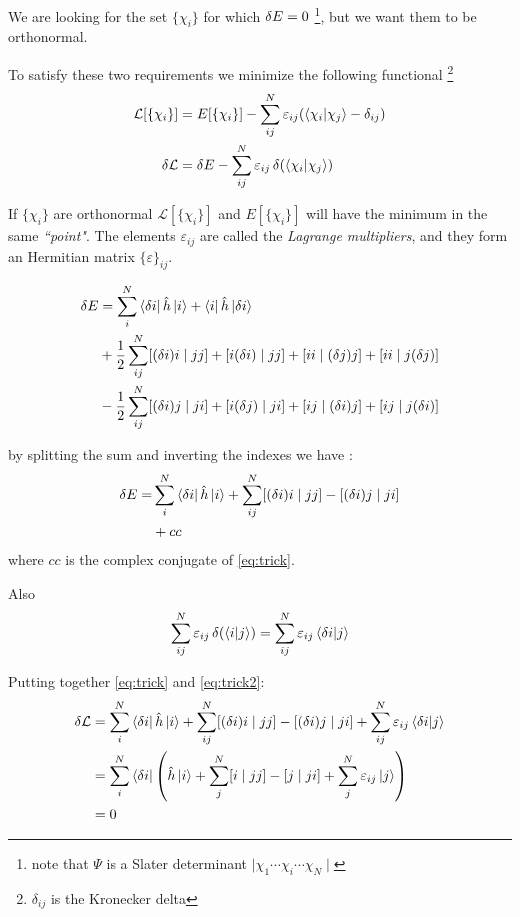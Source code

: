\documentclass[a4paper,12pt]{article}
\begin{document}
We are looking for the set $\{\chi_i\}$ for which $\var{E} = 0$ \footnote{note that $\Psi$ is a Slater determinant $\mid \chi_1 \cdots \chi_i \cdots \chi_N \mid$}, but we want them to be orthonormal.

To satisfy these two requirements we minimize the following functional \footnote{$\delta_{ij}$ is the Kronecker delta} 
\begin{align}
	\mathcal{L}[\{\chi_{i}\}] & = E[\{\chi_i\}] - \sum_{ij}^{N} \varepsilon_{ij} (\bra{\chi_{i}}\ket{\chi_{j}} - \delta_{ij})
\\
	\var{\mathcal{L}} & = \var{E} - \sum_{ij}^{N} \varepsilon_{ij} \var{(\bra{\chi_{i}}\ket{\chi_{j}})}	
\end{align}

If $\{\chi_i\}$ are orthonormal $\mathcal{L}[\{\chi_{i}\}]$ and $E[\{\chi_i\}]$ will have the minimum in the same \textit{``point"}. The elements $\varepsilon_{ij}$ are called the \textit{Lagrange multipliers}, and they form an Hermitian matrix $\{ \varepsilon \}_{ij}$.

\begin{align}
	\var{E} 	& = \sum_{i}^{N} \bra{\var{i}} \hat{h}  \ket{i} + \bra{i} \hat{h}  \ket{\var{i}} \\
			& + \frac{1}{2} \sum_{ij}^{N} [ (\var{i})i \mid j j ] + [ i(\var{i}) \mid j j ] + [ i i \mid (\var{j}) j ] + [ i i \mid j (\var{j}) ]\\
			& - \frac{1}{2} \sum_{ij}^{N} [ (\var{i})j \mid j i ] + [ i(\var{j}) \mid j i ] + [ i j \mid (\var{i}) j ] + [ i j \mid j (\var{i}) ]
\end{align}

by splitting the sum and inverting the indexes we have \cite[p.117-119]{Attila}:
\begin{align}
	\var{E} = &  \sum_{i}^{N} \bra{\var{i}} \hat{h}  \ket{i} + \sum_{ij}^{N}  [ (\var{i})i \mid j j ] - [ (\var{i}) j \mid j i ]  \label{eq:trick} \\
	& +  cc
\end{align}
where $cc$ is the complex conjugate of \eqref{eq:trick}.

Also
\begin{align}
	\sum_{ij}^{N} \varepsilon_{ij} \var{(\bra{i}\ket{j})} = \sum_{ij}^{N} \varepsilon_{ij} \bra{\var{i}}\ket{j} \label{eq:trick2}
\end{align}

Putting together \eqref{eq:trick} and \eqref{eq:trick2}:
\begin{align}
	\var{\mathcal{L}} & = \sum_{i}^{N} \bra{\var{i}} \hat{h}  \ket{i} + \sum_{ij}^{N}  [ (\var{i})i \mid j j ] - [ (\var{i}) j \mid j i ] + \sum_{ij}^{N} \varepsilon_{ij} \bra{\var{i}}\ket{j}\\
	& = \sum_{i}^{N} \bra{\var{i}} \left( 
		 \hat{h}  \ket{i} + \sum_{j}^{N}  [ i \mid j j ] - [  j \mid j i ] + \sum_{j}^{N} \varepsilon_{ij} \ket{j}
	\right) \label{eq:toNull}
	\\
	& = 0
\end{align}
\end{document}
